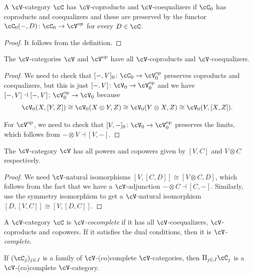 \documentclass[a4paper,11pt,oneside,openany]{scrbook}
\begin{document}
\begin{prop}
	A $\cV$-category $\cC$ has $\cV$-coproducts and $\cV$-coequalizers if $\cC_0$ has coproducts and coequalizers and these are preserved by the functor $\cC_0(-,D)\colon\cC_0\rightarrow\cV^{\op}$ for every $D\in\cC$.
\end{prop}

\begin{proof}
	It follows from the definition.
\end{proof}

\begin{cor}
	The $\cV$-categories $\cV$ and $\cV^{\op}$ have all $\cV$-coproducts and $\cV$-coequalizers.
\end{cor}

\begin{proof}
	We need to check that $[-,V]_0\colon\cC_0\rightarrow\cV_0^{\op}$ preserves coproducts and coequalizers, but this is just $[-,V]\colon\cV_0\rightarrow\cV_0^{\op}$ and we have $[-,V]\dashv[-,V]\colon\cV_0^{\op}\rightarrow\cV_0$ because
	$$\cV_0(X,[Y,Z])\cong\cV_0(X\otimes Y,Z)\cong\cV_0(Y\otimes X,Z)\cong\cV_0(Y,[X,Z]).$$

	For $\cV^{\op}$, we need to check that $[V,-]_0\colon\cV_0\rightarrow\cV_0^{\op}$ preserves the limits, which follows from $-\otimes V\dashv [V,-]$.
\end{proof}

\begin{prop}
	The $\cV$-category $\cV$ has all powers and copowers given by $[V,C]$ and $V\otimes C$ respectively.
\end{prop}

\begin{proof}
	We need $\cV$-natural isomorphisms $[V,[C,D]]\cong[V\otimes C,D]$, which follows from the fact that we have a $\cV$-adjunction $-\otimes C\dashv [C,-]$. Similarly, use the symmetry isomorphism to get a $\cV$-natural isomorphism $[D,[V,C]]\cong[V,[D,C]]$.
\end{proof}

\begin{defn}
	A $\cV$-category $\cC$ is \emph{$\cV$-cocomplete} if it has all $\cV$-coequalizers, $\cV$-coproducts and copowers. If it satisfies the dual conditions, then it is \emph{$\cV$-complete}.
\end{defn}

\begin{exmp}
	If $(\cC_j)_{j\in J}$ is a family of $\cV$-(co)complete $\cV$-categories, then $\Pi_{j\in J}\cC_j$ is a $\cV$-(co)complete $\cV$-category.
\end{exmp}
\end{document}
